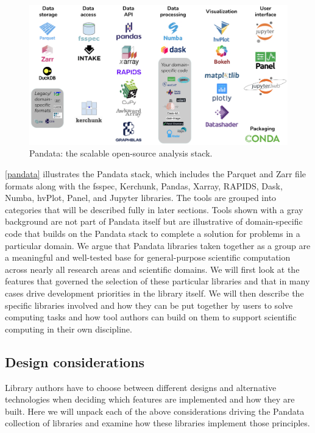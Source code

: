 \begin{figure}[t]
  \includegraphics[width=\textwidth]{pandata.png}
  \caption{Pandata: the scalable open-source analysis stack.}
  \label{pandata}
\end{figure}
\autoref{pandata} illustrates the Pandata stack, which includes the Parquet and Zarr file formats along with the fsspec, Kerchunk, Pandas, Xarray, RAPIDS, Dask, Numba, hvPlot, Panel, and Jupyter libraries. The tools are grouped into categories that will be described fully in later sections. Tools shown with a gray background are not part of Pandata itself but are illustrative of domain-specific code that builds on the Pandata stack to complete a solution for problems in a particular domain. We argue that Pandata libraries taken together as a group are a meaningful and well-tested base for general-purpose scientific computation across nearly all research areas and scientific domains. We will first look at the features that governed the selection of these particular libraries and that in many cases drive development priorities in the library itself. We will then describe the specific libraries involved and how they can be put together by users to solve computing tasks and how tool authors can build on them to support scientific computing in their own discipline.

\subsection{Design considerations}

Library authors have to choose between different designs and alternative technologies when deciding which features are implemented and how they are built.  Here we will unpack each of the above considerations driving the Pandata collection of libraries and examine how these libraries implement those principles.

